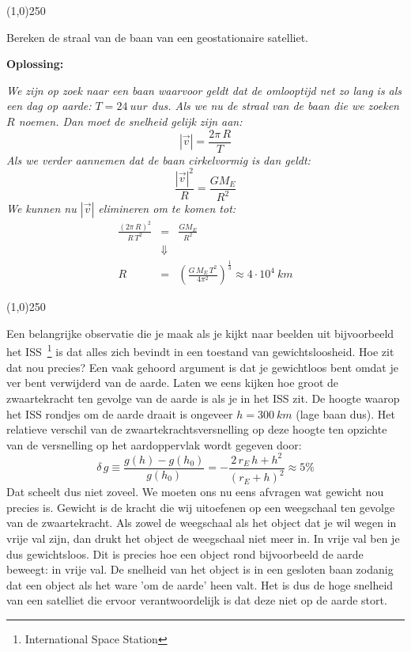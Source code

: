 \begin{center}
\line(1,0){250}
\end{center}
\begin{voorbeeld} 
Bereken de straal van de baan van een geostationaire satelliet.

{\bf Oplossing: }{\it We zijn op zoek naar een baan waarvoor geldt dat de omlooptijd net zo lang is als een dag 
op aarde: $T=24~uur$ dus. Als we nu de straal van de baan die we zoeken  $R$ noemen. Dan moet de snelheid gelijk zijn
aan:
\begin{equation}
|\vec{v}| = \frac{2\pi\,R}{T}
\end{equation}
Als we verder aannemen dat de baan cirkelvormig is dan geldt:
\begin{equation}
\frac{|\vec{v}|^2}{R} = \frac{G M_E}{R^2}
\end{equation}
We kunnen nu $|\vec{v}|$ elimineren om te komen tot:
\begin{eqnarray}
\frac{(2\pi\,R)^2}{R\,T^2} & = & \frac{G M_E}{R^2} \\
& \Downarrow & \\
R & = & \left(\frac{G\,M_E\,T^2}{4\pi^2}\right)^{\frac{1}{3}} \approx 4\cdot 10^4~km
\end{eqnarray}

}
\end{voorbeeld}
\begin{center}
\line(1,0){250}
\end{center}

Een belangrijke observatie die je maak als je kijkt naar beelden uit bijvoorbeeld het ISS~\footnote{International
Space Station} is dat alles zich bevindt in een toestand van gewichtsloosheid. Hoe zit dat nou precies? Een
 vaak gehoord argument is dat je gewichtloos bent omdat je ver bent verwijderd van de aarde. Laten we
 eens kijken hoe groot de zwaartekracht ten gevolge van de aarde is als je in het ISS zit. De hoogte waarop
 het ISS rondjes om de aarde draait is ongeveer $h=300~km$ (lage baan dus). Het relatieve verschil van de 
 zwaartekrachtsversnelling op deze hoogte ten opzichte van de versnelling op het aardoppervlak wordt 
 gegeven door:
 \begin{equation}
 \delta \, g \equiv \frac{g(h)-g(h_0)}{g(h_0)} = -\frac{2\,r_E\,h+h^2}{(r_E+h)^2} \approx 5\%
 \end{equation} 
Dat scheelt dus niet zoveel. We moeten ons nu eens afvragen wat gewicht nou precies is. Gewicht is de kracht die
wij uitoefenen op een weegschaal ten gevolge van de zwaartekracht. Als zowel de weegschaal als het object
dat je wil wegen in vrije val zijn, dan drukt het object de weegschaal niet meer in. In vrije val ben je dus
gewichtsloos. Dit is precies hoe een object rond bijvoorbeeld de aarde beweegt: in vrije val. De snelheid van 
het object is in een gesloten baan zodanig dat een object als het ware 'om de aarde' heen valt. Het is dus de hoge
snelheid van een satelliet die ervoor verantwoordelijk is dat deze niet op de aarde stort.

